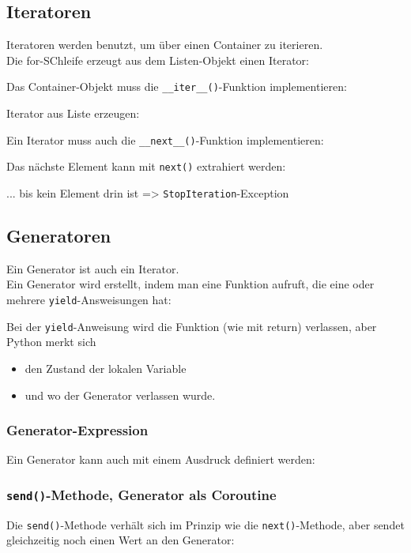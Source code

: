 \subsection{Iteratoren}
Iteratoren werden benutzt, um über einen Container zu iterieren.\\
Die for-SChleife erzeugt aus dem Listen-Objekt einen Iterator:

Das Container-Objekt muss die \texttt{\_\_iter\_\_()}-Funktion implementieren:

Iterator aus Liste erzeugen:

Ein Iterator muss auch die \texttt{\_\_next\_\_()}-Funktion implementieren:

Das nächste Element kann mit \texttt{next()} extrahiert werden:

... bis kein Element drin ist => \texttt{StopIteration}-Exception


\subsection{Generatoren}
Ein Generator ist auch ein Iterator.\\
Ein Generator wird erstellt, indem man eine Funktion aufruft, die eine oder mehrere \texttt{yield}-Answeisungen hat:

Bei der \texttt{yield}-Anweisung wird die Funktion (wie mit return) verlassen, aber Python merkt sich
\begin{itemize}
	\item den Zustand der lokalen Variable
	\item und wo der Generator verlassen wurde.
\end{itemize}


\subsubsection{Generator-Expression}
Ein Generator kann auch mit einem Ausdruck definiert werden:


\subsubsection{\texttt{send()}-Methode, Generator als Coroutine}
Die \texttt{send()}-Methode verhält sich im Prinzip wie die \texttt{next()}-Methode, aber sendet gleichzeitig noch einen Wert an den Generator:


